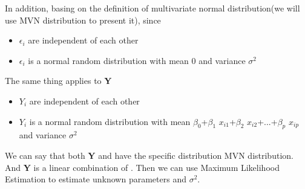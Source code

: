 \documentclass[a4paper]{article}
\begin{document}
\noindent
In addition, basing on the definition of multivariate normal distribution(we will use MVN distribution to present it),  since 
\begin{itemize}
    \item $\epsilon_i$ are independent of each other
    \item $\epsilon_i$ is a normal random distribution with mean 0 and variance $\sigma^2$
\end{itemize}
The same thing applies to \textbf{Y}
\begin{itemize}
    \item $Y_i$ are independent of each other
    \item $Y_i$ is a normal random distribution with mean $\beta_0$+$\beta_1$ $x_{i1}$+$\beta_2$ $x_{i2}$+...+$\beta_p$ $x_{ip}$ and variance $\sigma^2$
\end{itemize}
We can say that both \textbf{Y} and \bm{$\epsilon$} have the specific distribution MVN distribution. And \textbf{Y} is a linear combination of \bm{$\epsilon$}. Then we can use Maximum Likelihood Estimation to estimate unknown parameters \bm{$\beta$} and $\sigma^2$.\\
\end{document}
